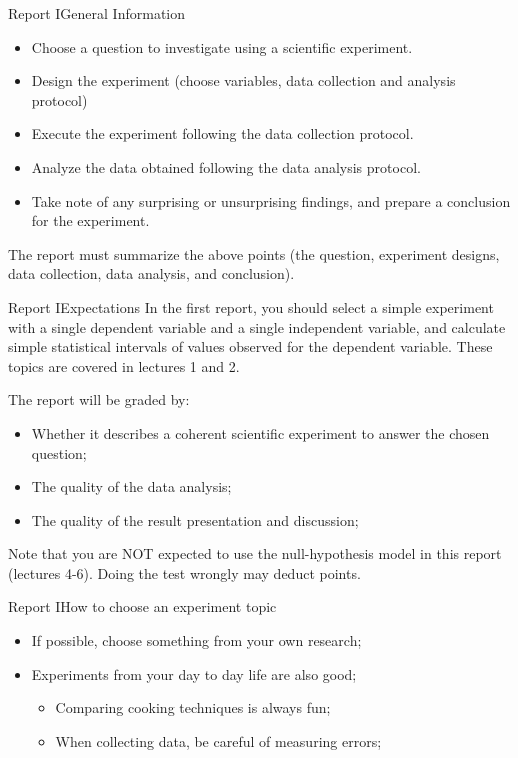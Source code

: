 \documentclass[aspectratio=169]{beamer}
\begin{document}
\begin{CJK}{UTF8}{ipxm}
\begin{frame}{Report I}{General Information}
  \begin{itemize}
    \item Choose a question to investigate using a scientific experiment.
    \item Design the experiment (choose variables, data collection and analysis protocol)
    \item Execute the experiment following the data collection protocol.
    \item Analyze the data obtained following the data analysis protocol.
    \item Take note of any surprising or unsurprising findings, and prepare a conclusion for the experiment.
  \end{itemize}\medskip

  The report must summarize the above points (the question, experiment designs, data collection, data analysis, and conclusion).
\end{frame}

\begin{frame}{Report I}{Expectations}
  In the first report, you should select a simple experiment with a single dependent variable and a single independent variable, and calculate simple statistical intervals of values observed for the dependent variable. These topics are covered in lectures 1 and 2.\smallskip

  The report will be graded by:
  \begin{itemize}
    \item Whether it describes a coherent scientific experiment to answer the chosen question;
    \item The quality of the data analysis;
    \item The quality of the result presentation and discussion;
  \end{itemize}\bigskip

\alert{Note that you are NOT expected to use the null-hypothesis model in this report (lectures 4-6). Doing the test wrongly may deduct points.}
\end{frame}



\begin{frame}{Report I}{How to choose an experiment topic}
  \begin{itemize}
    \item If possible, choose something from your own research;
    \medskip

    \item Experiments from your day to day life are also good;
    \begin{itemize}
      \item Comparing cooking techniques is always fun;
      \item When collecting data, be careful of measuring errors;
    \end{itemize}
    \medskip


\end{itemize}
\end{frame}
\end{CJK}
\end{document}
